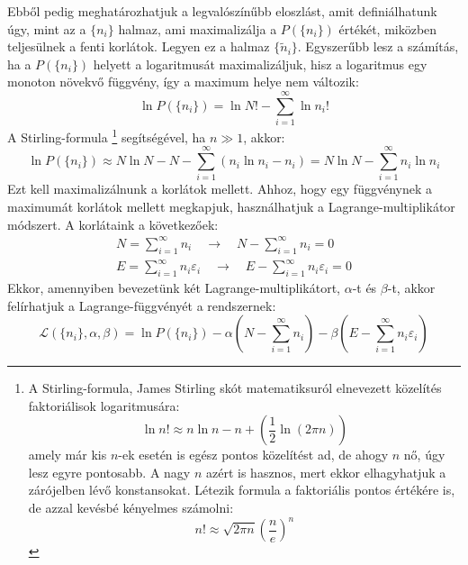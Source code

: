 \documentclass[../main.tex]{subfiles}
\begin{document}
Ebből pedig meghatározhatjuk a legvalószínűbb eloszlást, amit definiálhatunk úgy, mint az a $\{n_i\}$ halmaz, ami maximalizálja a $P(\{n_i\})$ értékét, miközben teljesülnek a fenti korlátok.
Legyen ez a halmaz $\{\tilde{n}_i\}$. Egyszerűbb lesz a számítás, ha a $P(\{n_i\})$ helyett a logaritmusát maximalizáljuk, hisz a logaritmus egy monoton növekvő függvény, így a maximum helye nem változik:
\begin{equation}
    \ln P(\{n_i\}) = \ln N! - \sum_{i = 1}^\infty \ln n_i!
\end{equation}
A Stirling-formula
\footnote{
    A Stirling-formula, James Stirling skót matematiksuról elnevezett közelítés faktoriálisok logaritmusára:
    \begin{equation*}
        \ln n! \approx n \ln n - n + \left(\frac{1}{2} \ln (2 \pi n)\right)
    \end{equation*}
    amely már kis $n$-ek esetén is egész pontos közelítést ad, de ahogy $n$ nő, úgy lesz egyre pontosabb. A nagy $n$ azért is hasznos, mert ekkor elhagyhatjuk a zárójelben lévő konstansokat.
    Létezik formula a faktoriális pontos értékére is, de azzal kevésbé kényelmes számolni:
    \begin{equation*}
        n! \approx \sqrt{2 \pi n} \left( \frac{n}{e} \right)^n
    \end{equation*}
}
segítségével, ha $n \gg 1$, akkor:
\begin{equation}
    \ln P(\{n_i\}) \approx N \ln N - N - \sum_{i = 1}^\infty (n_i \ln n_i - n_i) = N \ln N - \sum_{i = 1}^\infty n_i \ln n_i
\end{equation}
Ezt kell maximalizálnunk a korlátok mellett. Ahhoz, hogy egy függvénynek a maximumát korlátok mellett megkapjuk, használhatjuk a Lagrange-multiplikátor módszert. 
A korlátaink a következőek:
\begin{equation}
    \begin{aligned}
        N = \sum_{i = 1}^\infty n_i \quad \rightarrow \quad N - \sum_{i = 1}^\infty n_i = 0 \\
        E = \sum_{i = 1}^\infty n_i \varepsilon_i \quad \rightarrow \quad E - \sum_{i = 1}^\infty n_i \varepsilon_i = 0
    \end{aligned}
\end{equation}
Ekkor, amennyiben bevezetünk két Lagrange-multiplikátort, $\alpha$-t és $\beta$-t, akkor felírhatjuk a Lagrange-függvényét a rendszernek:
\begin{equation}
    \mathcal{L}(\{n_i\}, \alpha, \beta) = \ln P(\{n_i\}) - \alpha \left( N - \sum_{i = 1}^\infty n_i \right) - \beta \left( E - \sum_{i = 1}^\infty n_i \varepsilon_i \right)
\end{equation}
\end{document}
